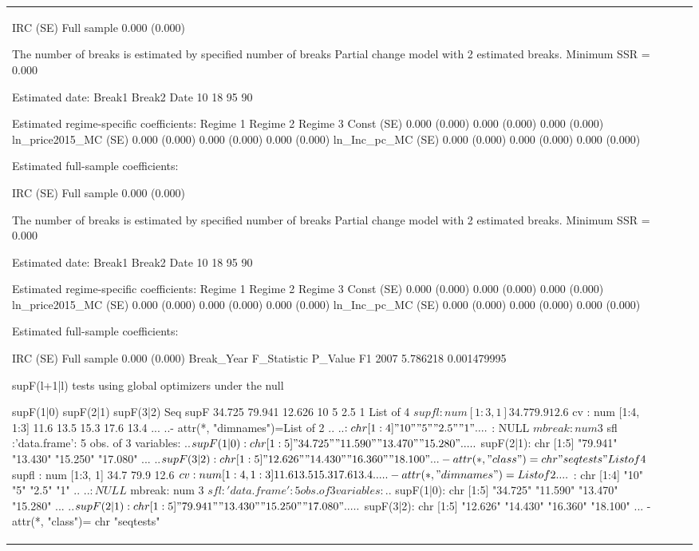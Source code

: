 \begin{table}[h]
\begin{tabular}{lccc}
                 IRC (SE)
Full sample 0.000 (0.000)

The number of breaks is estimated by specified number of breaks 
Partial change model with 2 estimated breaks.
Minimum SSR = 0.000 

Estimated date:
        Break1  Break2
Date        10      18
95%
90%

Estimated regime-specific coefficients:
                          Regime 1      Regime 2      Regime 3
Const (SE)           0.000 (0.000) 0.000 (0.000) 0.000 (0.000)
ln_price2015_MC (SE) 0.000 (0.000) 0.000 (0.000) 0.000 (0.000)
ln_Inc_pc_MC (SE)    0.000 (0.000) 0.000 (0.000) 0.000 (0.000)

Estimated full-sample coefficients:

                 IRC (SE)
Full sample 0.000 (0.000)

The number of breaks is estimated by specified number of breaks 
Partial change model with 2 estimated breaks.
Minimum SSR = 0.000 

Estimated date:
        Break1  Break2
Date        10      18
95%
90%

Estimated regime-specific coefficients:
                          Regime 1      Regime 2      Regime 3
Const (SE)           0.000 (0.000) 0.000 (0.000) 0.000 (0.000)
ln_price2015_MC (SE) 0.000 (0.000) 0.000 (0.000) 0.000 (0.000)
ln_Inc_pc_MC (SE)    0.000 (0.000) 0.000 (0.000) 0.000 (0.000)

Estimated full-sample coefficients:

                 IRC (SE)
Full sample 0.000 (0.000)
   Break_Year F_Statistic     P_Value
F1       2007    5.786218 0.001479995

supF(l+1|l) tests using global optimizers under the null

         supF(1|0) supF(2|1) supF(3|2)
Seq supF    34.725    79.941    12.626
10%
5%
2.5%
1%
List of 4
 $ supfl : num [1:3, 1] 34.7 79.9 12.6
 $ cv    : num [1:4, 1:3] 11.6 13.5 15.3 17.6 13.4 ...
  ..- attr(*, "dimnames")=List of 2
  .. ..$ : chr [1:4] "10" "5" "2.5" "1"
  .. ..$ : NULL
 $ mbreak: num 3
 $ sfl   :'data.frame':	5 obs. of  3 variables:
  ..$ supF(1|0): chr [1:5] "34.725" "11.590" "13.470" "15.280" ...
  ..$ supF(2|1): chr [1:5] "79.941" "13.430" "15.250" "17.080" ...
  ..$ supF(3|2): chr [1:5] "12.626" "14.430" "16.360" "18.100" ...
 - attr(*, "class")= chr "seqtests"
List of 4
 $ supfl : num [1:3, 1] 34.7 79.9 12.6
 $ cv    : num [1:4, 1:3] 11.6 13.5 15.3 17.6 13.4 ...
  ..- attr(*, "dimnames")=List of 2
  .. ..$ : chr [1:4] "10" "5" "2.5" "1"
  .. ..$ : NULL
 $ mbreak: num 3
 $ sfl   :'data.frame':	5 obs. of  3 variables:
  ..$ supF(1|0): chr [1:5] "34.725" "11.590" "13.470" "15.280" ...
  ..$ supF(2|1): chr [1:5] "79.941" "13.430" "15.250" "17.080" ...
  ..$ supF(3|2): chr [1:5] "12.626" "14.430" "16.360" "18.100" ...
 - attr(*, "class")= chr "seqtests"


\end{tabular}
\end{table}
